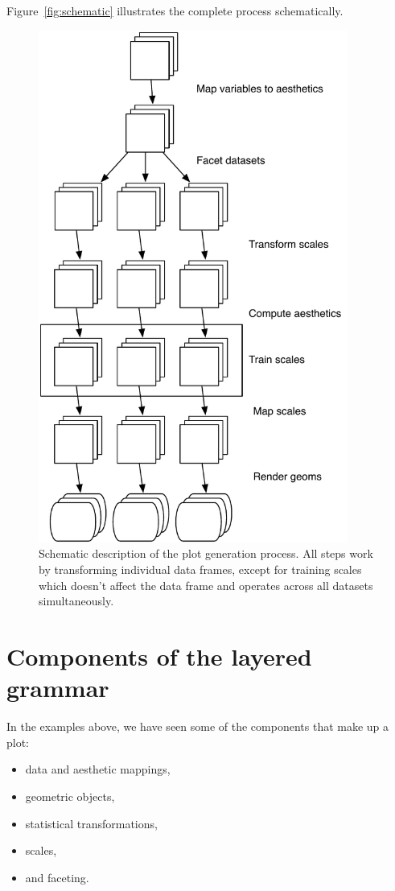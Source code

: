 Figure~\ref{fig:schematic} illustrates the complete process schematically.

\begin{figure}[htbp]
  \centering
  \includegraphics[width=4in]{mastery-schema}
  \caption{Schematic description of the plot generation process.  All steps work by transforming individual data frames, except for training scales which doesn't affect the data frame and operates across all datasets simultaneously.}
  \label{fig:label}
\end{figure}

\section{Components of the layered grammar}
\label{sec:components}

In the examples above, we have seen some of the components that make up a plot:

\begin{itemize}
  \item data and aesthetic mappings,
  \item geometric objects, 
  \item statistical transformations,
  \item scales,
  \item and faceting.
\end{itemize}

